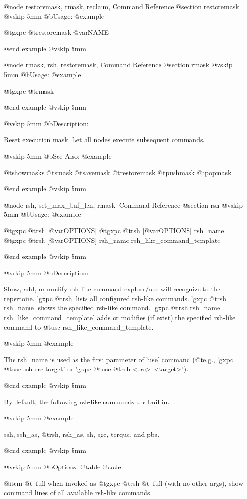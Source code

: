 @node restoremask, rmask, reclaim, Command Reference
@section restoremask
@vskip 5mm
@b{Usage:}
@example

  @t{gxpc} @t{restoremask} @var{NAME}

@end example
@vskip 5mm

@node rmask, rsh, restoremask, Command Reference
@section rmask
@vskip 5mm
@b{Usage:}
@example

  @t{gxpc} @t{rmask}

@end example
@vskip 5mm

@vskip 5mm
@b{Description:}


  Reset execution mask. Let all nodes execute subsequent commands.

@vskip 5mm
@b{See Also:}
@example

  @t{showmasks} @t{smask} @t{savemask} @t{restoremask} @t{pushmask} @t{popmask}

@end example
@vskip 5mm

@node rsh, set_max_buf_len, rmask, Command Reference
@section rsh
@vskip 5mm
@b{Usage:}
@example

  @t{gxpc} @t{rsh} [@var{OPTIONS}]
  @t{gxpc} @t{rsh} [@var{OPTIONS}] rsh_name
  @t{gxpc} @t{rsh} [@var{OPTIONS}] rsh_name rsh_like_command_template

@end example
@vskip 5mm

@vskip 5mm
@b{Description:}


  Show, add, or modify rsh-like command explore/use will recognize
  to the repertoire.
  'gxpc @t{rsh}' lists all configured rsh-like commands.
  'gxpc @t{rsh} rsh_name' shows the specified rsh-like command.
  'gxpc @t{rsh} rsh_name rsh_like_command_template' adds or modifies (if exist)
  the specified rsh-like command to @t{use} rsh_like_command_template.

@vskip 5mm
@example

  The rsh_name is used as the first parameter of 'use' command (@t{e}.g.,
  'gxpc @t{use} ssh src target' or 'gxpc @t{use} @t{rsh} <src> <target>').

@end example
@vskip 5mm

  By default, the following rsh-like commands are builtin.

@vskip 5mm
@example

  ssh, ssh_as, @t{rsh}, rsh_as, sh, sge, torque, and pbs.

@end example
@vskip 5mm

@vskip 5mm
@b{Options:}
@table @code

@item   @t{--full}
    when invoked as @t{gxpc} @t{rsh} @t{--full} (with no other args),
    show command lines of all available rsh-like commands.

